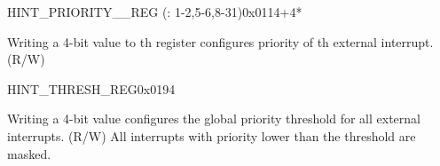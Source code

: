 \begin{register}{H}{INT\_PRIORITY\_\_REG (: 1-2,5-6,8-31)}{0x0114+4*}\label{regdesc:INTPRIORITYREG}
%
%
\regnewline%
\begin{regdesc}
\begin{reglist}
\label{fielddesc:INTPRIORITY}\item [INT\_PRIORITY\_\regindex{n}] Writing a 4-bit value to th register configures priority of th external interrupt. (R/W)
\end{reglist}
\end{regdesc}
\end{register}

\begin{register}{H}{INT\_THRESH\_REG}{0x0194}\label{regdesc:INTTHRESHREG}
%
%
\regnewline%
\begin{regdesc}
\begin{reglist}
\label{fielddesc:INTTHRESH}\item [INT\_THRESH] Writing a 4-bit value configures the global priority threshold for all external interrupts. (R/W) \newline All interrupts with priority lower than the threshold are masked. \newline
\end{reglist}
\end{regdesc}
\end{register}
